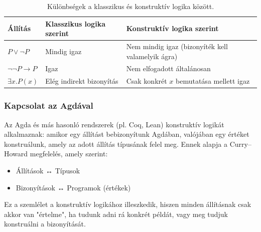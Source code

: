 \begin{table}[H]
\centering
\begin{tabular}{|l|l|p{6cm}|}
\hline
\textbf{Állítás} & \textbf{Klasszikus logika szerint} & \textbf{Konstruktív logika szerint} \\ \hline
\(P \lor \neg P\) & Mindig igaz & Nem mindig igaz (bizonyíték kell valamelyik ágra) \\ \hline
\(\neg\neg P \to P\) & Igaz & Nem elfogadott általánosan \\ \hline
\(\exists x. P(x)\) & Elég indirekt bizonyítás & Csak konkrét \(x\) bemutatása mellett igaz \\ \hline
\end{tabular}
\caption{Különbségek a klasszikus és konstruktív logika között.}
\label{tab:classical_vs_constructive_logic}
\end{table}

\subsubsection{Kapcsolat az Agdával}

Az Agda és más hasonló rendszerek (pl. Coq, Lean) konstruktív logikát alkalmaznak: amikor egy állítást bebizonyítunk Agdában, valójában egy értéket konstruálunk, amely az adott állítás típusának felel meg. Ennek alapja a Curry–Howard megfelelés, amely szerint:

\begin{itemize}
\item Állítások ↔ Típusok  
\item Bizonyítások ↔ Programok (értékek)
\end{itemize}

Ez a szemlélet a konstruktív logikához illeszkedik, hiszen minden állításnak csak akkor van "értelme", ha tudunk adni rá konkrét példát, vagy meg tudjuk konstruálni a bizonyítását.
